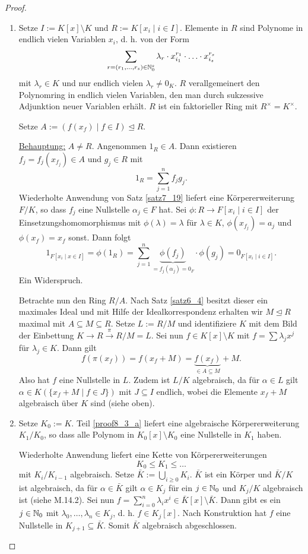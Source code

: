 \begin{proof}
	\begin{enumerate}[label=(\alph*)]
		\item\label{proof8_3_a}  Setze $I := K[x] \setminus K$ und $R := K[x_i \mid i \in I]$. Elemente in $R$ sind Polynome in endlich vielen Variablen $x_i$, d. h. von der Form
		\[\sum_{r = (r_1, \dots, r_s) \in \mathbb{N}_0^s} \lambda_r \cdot x_{i_1}^{r_1} \cdot \hdots \cdot x_{i_s}^{r_s}\]
		mit $\lambda_r \in K$ und nur endlich vielen $\lambda_r \neq 0_K$. $R$ verallgemeinert den Polynomring in endlich vielen Variablen, den man durch sukzessive Adjunktion neuer Variablen erhält. $R$ ist ein faktorieller Ring mit $R^\times = K^\times$.
		
		Setze $A := (f(x_f) \mid f \in I) \unlhd R$.
		
		\underline{Behauptung:} $A \neq R$. Angenommen $1_R \in A$. Dann existieren $f_j = f_j (x_{f_j}) \in A$ und $g_j \in R$ mit 
		\[1_R = \sum_{j=1}^n f_j g_j.\]
		Wiederholte Anwendung von Satz \ref{satz7_19} liefert eine Körpererweiterung $F/K$, so dass $f_j$ eine Nullstelle $\alpha_j \in F$ hat. Sei $\phi \colon R \to F[x_i \mid i \in I]$ der Einsetzungshomomorphismus mit $\phi(\lambda) = \lambda$ für $\lambda \in K$, $\phi(x_{f_j}) = a_j$ und $\phi(x_f) = x_f$ sonst. Dann folgt
		\[1_{F[x_i \mid x \in I]} = \phi(1_R) = \sum_{j=1}^n \underbrace{\phi(f_j)}_{=f_j(\alpha_j) = 0_F} \cdot \phi(g_j) = 0_{F[x_i \mid i \in I]}.\]
		Ein Widerspruch.
		
		Betrachte nun den Ring $R/A$. Nach Satz \ref{satz6_4} besitzt dieser ein maximales Ideal und mit Hilfe der Idealkorrespondenz erhalten wir $M \unlhd R$ maximal mit $A \subseteq M \subseteq R$. Setze $L := R/M$ und identifiziere $K$ mit dem Bild der Einbettung $K \to R \overset{\pi}{\to} R/M = L$. Sei nun $f \in K[x] \setminus K$ mit $f = \sum \lambda_j x^j$ für $\lambda_j \in K$. Dann gilt
		\[f(\pi(x_f)) = f(x_f + M) = \underbrace{f(x_f)}_{\in A \subseteq M} + M.\]
		Also hat $f$ eine Nullstelle in $L$. Zudem ist $L/K$ algebraisch, da für $\alpha \in L$ gilt $\alpha \in K(\{x_f + M \mid f \in J\})$ mit $J \subseteq I$ endlich, wobei die Elemente $x_f + M$ algebraisch über $K$ sind (siehe oben).
		\item Setze $K_0 := K$. Teil \ref{proof8_3_a} liefert eine algebraische Körpererweiterung $K_1 / K_0$, so dass alle Polynom in $K_0[x] \setminus K_0$ eine Nullstelle in $K_1$ haben.
		
		Wiederholte Anwendung liefert eine Kette von Körpererweiterungen 
		\[K_0 \leq K_1 \leq \dots\]
		mit $K_i/K_{i-1}$ algebraisch. Setze $\bar{K} := \bigcup_{i \geq 0} K_i$. $\bar{K}$ ist ein Körper und $\bar{K} / K$ ist algebraisch, da für $\alpha \in \bar{K}$ gilt $\alpha \in K_j$ für ein $j \in \mathbb{N}_0$ und $K_j / K$ algebraisch ist (siehe M.14.2). Sei nun $f = \sum_{i=0}^n \lambda_i x^i \in \bar{K}[x] \setminus \bar{K}$. Dann gibt es ein $j \in \mathbb{N}_0$ mit $\lambda_0, \dots, \lambda_n \in K_j$, d. h. $f \in K_j[x]$. Nach Konstruktion hat $f$ eine Nullstelle in $K_{j+1} \subseteq \bar{K}$. Somit $\bar{K}$ algebraisch abgeschlossen.
	\end{enumerate}
\end{proof}

